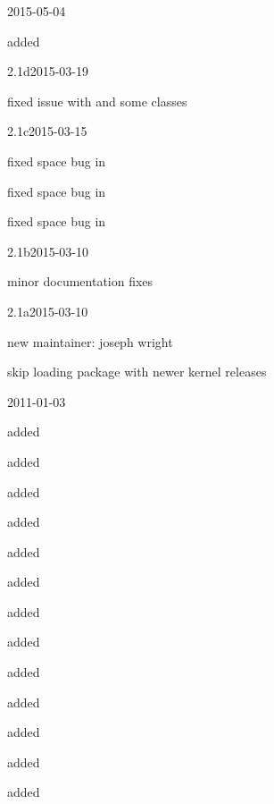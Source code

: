 \begin{changelog}
\begin{release}{2.2}{2015-05-04}
\item added 
\end{release}

\begin{release}{2.1d}{2015-03-19}
\item fixed issue with  and some classes
\end{release}

\begin{release}{2.1c}{2015-03-15}
\item fixed space bug in 
\item fixed space bug in 
\item fixed space bug in 
\end{release}

\begin{release}{2.1b}{2015-03-10}
\item minor documentation fixes
\end{release}

\begin{release}{2.1a}{2015-03-10}
\item new maintainer: joseph  wright
\item skip loading  package with newer \latex kernel releases
\end{release}

\begin{release}{2.1}{2011-01-03}
\item added 
\item added 
\item added 
\item added 
\item added 
\item added 
\item added 
\item added 
\item added 
\item added 
\item added 
\item added 
\item added 
\end{release}


\end{changelog}
